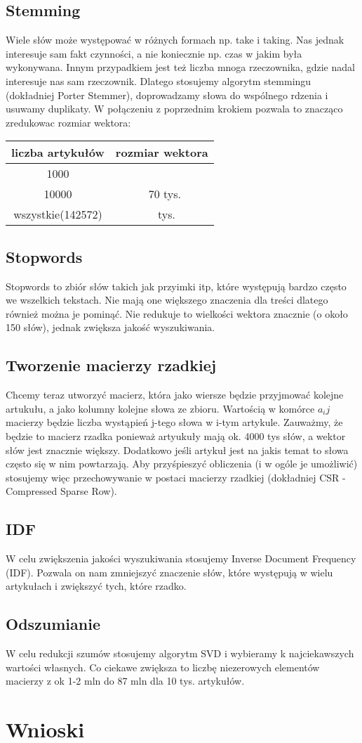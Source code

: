 \documentclass{article}
\begin{document}
\subsection{Stemming}
Wiele słów może występować w różnych formach np. take i taking. Nas jednak interesuje sam fakt czynności, a nie koniecznie np. czas w jakim była wykonywana. Innym przypadkiem jest też liczba mnoga rzeczownika, gdzie nadal interesuje nas sam rzeczownik. Dlatego stosujemy algorytm stemmingu (dokładniej Porter Stemmer), doprowadzamy słowa do wspólnego rdzenia i usuwamy duplikaty. 
W połączeniu z poprzednim krokiem pozwala to znacząco zredukowac rozmiar wektora:
\begin{center}
	\begin{tabular}{c|c}
	liczba artykułów & rozmiar wektora \\ \hline
	1000 &  \\ \hline
	10000 & ~70 tys.\\ \hline
	wszystkie(142572) & ~ tys.\\
	\end{tabular}
\end{center}
\subsection{Stopwords}
Stopwords to zbiór słów takich jak przyimki itp, które występują bardzo często we wszelkich tekstach. Nie mają one większego znaczenia dla treści dlatego również można je pominąć. Nie redukuje to wielkości wektora znacznie (o około 150 słów), jednak zwiększa jakość wyszukiwania.
\subsection{Tworzenie macierzy rzadkiej}
Chcemy teraz utworzyć macierz, która jako wiersze będzie przyjmować kolejne artukułu, a jako kolumny kolejne słowa ze zbioru. Wartością w komórce $a_ij$ macierzy będzie liczba wystąpień j-tego słowa w i-tym artykule. Zauważmy, że będzie to macierz rzadka ponieważ artyukuły mają ok. 4000 tys słów, a wektor słów jest znacznie większy. Dodatkowo jeśli artykuł jest na jakis temat to słowa często się w nim powtarzają.
Aby przyśpieszyć obliczenia (i w ogóle je umożliwić) stosujemy więc przechowywanie w postaci macierzy rzadkiej (dokładniej CSR - Compressed Sparse Row).
\subsection{IDF}
W celu zwiększenia jakości wyszukiwania stosujemy Inverse Document Frequency (IDF). Pozwala on nam zmniejszyć znaczenie słów, które występują w wielu artykułach i zwiększyć tych, które rzadko.
\subsection{Odszumianie}
W celu redukcji szumów stosujemy algorytm SVD i wybieramy k najciekawszych wartości własnych. Co ciekawe zwiększa to liczbę niezerowych elementów macierzy z ok 1-2 mln do 87 mln dla 10 tys. artykułów.
\section{Wnioski}
\end{document}
